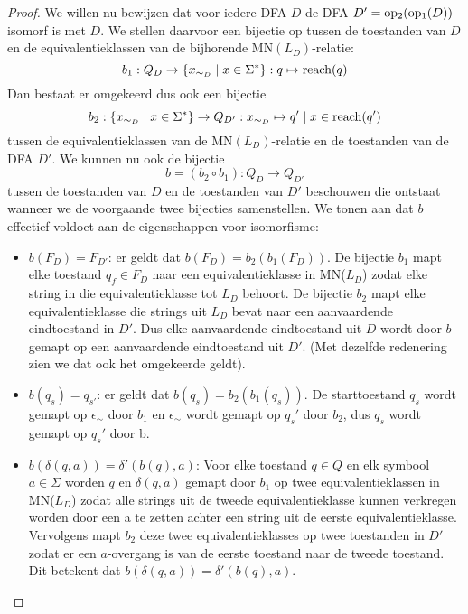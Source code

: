 \documentclass[../aanvullingen_cursus.tex]{subfiles}
\begin{document}
\begin{proof}
	\newpage
	We willen nu bewijzen dat voor iedere DFA \(D\) de DFA \(D'=\operatorname{op_2}(\operatorname{op_1}(D))\) isomorf is met \(D\). We stellen daarvoor een bijectie op tussen de toestanden van \(D\) en de equivalentieklassen van de bijhorende MN\((L_D)\)-relatie: \[b_1:Q_D\to \{x_{\sim_D} \mid x\in \Sigma^*\}: q \mapsto \operatorname{reach}(q)\] Dan bestaat er omgekeerd dus ook een bijectie \[b_2:\{x_{\sim_D} \mid x\in \Sigma^*\} \to Q_{D'}: x_{\sim_D} \mapsto q' \mid x\in\operatorname{reach}(q')\] tussen de equivalentieklassen van de MN\((L_D)\)-relatie en de toestanden van de DFA \(D'\). We kunnen nu ook de bijectie \[b=(b_2 \circ b_1):Q_D\to Q_{D'}\] tussen de toestanden van \(D\) en de toestanden van \(D'\) beschouwen die ontstaat wanneer we de voorgaande twee bijecties samenstellen. We tonen aan dat \(b\) effectief voldoet aan de eigenschappen voor isomorfisme:
	\begin{itemize}
		\item \underline{\(b(F_D)=F_{D'}\)}: er geldt dat \(b(F_D)=b_2(b_1(F_D))\). De bijectie \(b_1\) mapt elke toestand \(q_f \in F_D\) naar een equivalentieklasse in MN(\(L_D\)) zodat elke string in die equivalentieklasse tot \(L_D\) behoort. De bijectie \(b_2\) mapt elke equivalentieklasse die strings uit \(L_D\) bevat naar een aanvaardende eindtoestand in \(D'\). Dus elke aanvaardende eindtoestand uit \(D\) wordt door \(b\) gemapt op een aanvaardende eindtoestand uit \(D'\). (Met dezelfde redenering zien we dat ook het omgekeerde geldt).
		\item \underline{\(b(q_{s})=q_{s'}\)}: er geldt dat \(b(q_s)=b_2(b_1(q_s))\). De starttoestand \(q_s\) wordt gemapt op \(\epsilon_{\sim}\) door \(b_1\) en \(\epsilon_{\sim}\) wordt gemapt op \(q_s'\) door \(b_2\), dus \(q_s\) wordt gemapt op \(q_s'\) door b.
		\item \underline{\(b(\delta(q,a))=\delta'(b(q),a)\)}: Voor elke toestand \(q \in Q\) en elk symbool \(a \in \Sigma\) worden \(q\) en \(\delta(q,a)\) gemapt door \(b_1\) op twee equivalentieklassen in MN(\(L_D\)) zodat alle strings uit de tweede equivalentieklasse kunnen verkregen worden door een a te zetten achter een string uit de eerste equivalentieklasse. Vervolgens mapt \(b_2\) deze twee equivalentieklasses op twee toestanden in \(D'\) zodat er een \(a\)-overgang is van de eerste toestand naar de tweede toestand. Dit betekent dat \(b(\delta(q,a))=\delta'(b(q),a)\).
	\end{itemize}

\end{proof}
\end{document}
